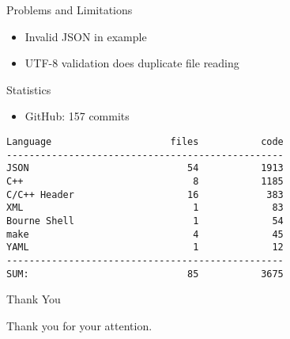 \documentclass{beamer}
\begin{document}
\begin{frame}{Problems and Limitations}

    \begin{itemize}

        \item Invalid JSON in example

        \item UTF-8 validation does duplicate file reading

    \end{itemize}

\end{frame}

\begin{frame}[fragile]{Statistics}

\begin{itemize}

    \item GitHub: 157 commits

\end{itemize}

\begin{Verbatim}
Language                     files           code
-------------------------------------------------
JSON                            54           1913
C++                              8           1185
C/C++ Header                    16            383
XML                              1             83
Bourne Shell                     1             54
make                             4             45
YAML                             1             12
-------------------------------------------------
SUM:                            85           3675
\end{Verbatim}

\end{frame}

\begin{frame}{Thank You}
    \Huge{\centerline{Thank you for your attention.}}
\end{frame}

\end{document}
